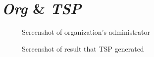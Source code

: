 \section{\textit{Org} \& \textit{TSP}}

\begin{figure}[htb]
    \centering
    \caption{{\footnotesize Screenshot of organization's administrator}}
    \label{fig:verifyID}
\end{figure}

\begin{figure}[htb]
    \centering
    \caption{{\footnotesize Screenshot of result that TSP generated}}
    \label{fig:result}
\end{figure}